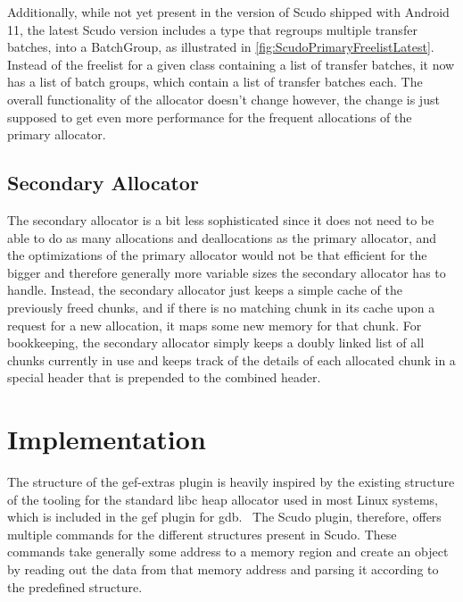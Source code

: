\documentclass[a4paper,11pt,oneside]{report}
\begin{document}
Additionally, while not yet present in the version of Scudo shipped with Android
11, the latest Scudo version includes a type that regroups multiple transfer
batches, into a BatchGroup, as illustrated in \autoref{fig:ScudoPrimaryFreelistLatest}.
Instead of the freelist for a given class containing
a list of transfer batches, it now has a list of batch groups, which contain
a list of transfer batches each. The overall functionality of the allocator
doesn't change however, the change is just supposed to get even more performance
for the frequent allocations of the primary allocator.

\section{Secondary Allocator}

The secondary allocator is a bit less sophisticated since it does not need to
be able to do as many allocations and deallocations as the primary allocator,
and the optimizations of the primary allocator would not be that efficient for
the bigger and therefore generally more variable sizes the secondary allocator
has to handle. Instead, the secondary allocator just keeps a simple cache of
the previously freed chunks, and if there is no matching chunk in its cache
upon a request for a new allocation, it maps some new memory for that chunk.
For bookkeeping, the secondary allocator simply keeps a doubly linked list of
all chunks currently in use and keeps track of the details of each allocated
chunk in a special header that is prepended to the combined header.

\chapter{Implementation}

The structure of the gef-extras plugin is heavily inspired by the existing
structure of the tooling for the standard libc heap allocator used in most
Linux systems, which is included in the gef plugin for gdb.~\cite{gef} The
Scudo plugin, therefore, offers multiple commands for the different structures
present in Scudo. These commands take generally some address to a memory
region and create an object by reading out the data from that memory address
and parsing it according to the predefined structure.
\end{document}
